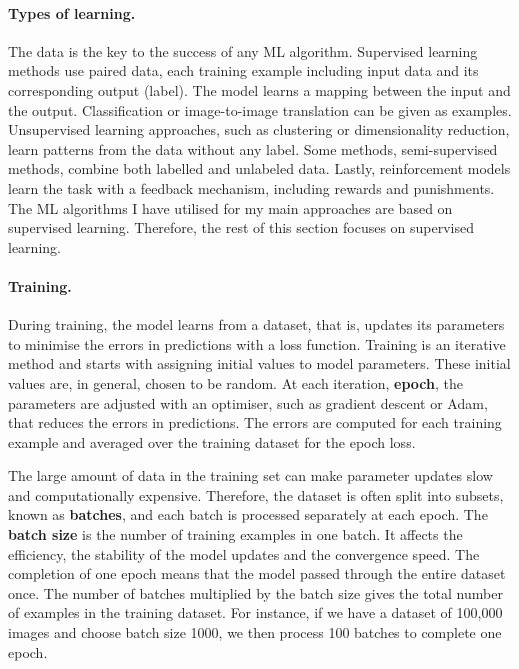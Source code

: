 \paragraph{Types of learning.} The data is the key to the success of any ML algorithm. Supervised learning methods use paired data, each training example including input data and its corresponding output (label). The model learns a mapping between the input and the output. Classification or image-to-image translation can be given as examples. Unsupervised learning approaches, such as clustering or dimensionality reduction, learn patterns from the data without any label. Some methods, semi-supervised methods, combine both labelled and unlabeled data. Lastly, reinforcement models learn the task with a feedback mechanism, including rewards and punishments. The ML algorithms I have utilised for my main approaches are based on supervised learning. Therefore, the rest of this section focuses on supervised learning.

\paragraph{Training.} During training, the model learns from a dataset, that is, updates its parameters to minimise the errors in predictions with a loss function. Training is an iterative method and starts with assigning initial values to model parameters. These initial values are, in general, chosen to be random. At each iteration, \textbf{epoch}, the parameters are adjusted with an optimiser, such as gradient descent or Adam, that reduces the errors in predictions. The errors are computed for each training example and averaged over the training dataset for the epoch loss. 

The large amount of data in the training set can make parameter updates slow and computationally expensive. Therefore, the dataset is often split into subsets, known as \textbf{batches}, and each batch is processed separately at each epoch. The \textbf{batch size} is the number of training examples in one batch. It affects the efficiency, the stability of the model updates and the convergence speed. The completion of one epoch means that the model passed through the entire dataset once. The number of batches multiplied by the batch size gives the total number of examples in the training dataset. For instance, if we have a dataset of 100,000 images and choose batch size 1000, we then process 100 batches to complete one epoch. 

